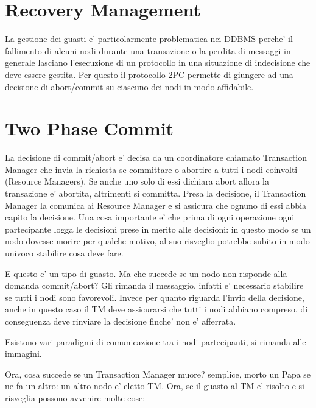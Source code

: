 \section{Recovery Management}

La gestione dei guasti e' particolarmente problematica nei DDBMS perche' il fallimento di alcuni nodi durante una transazione o la perdita di messaggi in generale lasciano l'esecuzione di un protocollo in una situazione di indecisione che deve essere gestita.
Per questo il protocollo 2PC permette di giungere ad una decisione di abort/commit su ciascuno dei nodi in modo affidabile.

\section{Two Phase Commit}


La decisione di commit/abort e' decisa da un coordinatore chiamato Transaction Manager che invia la richiesta se committare o abortire a tutti i nodi coinvolti (Resource Managers). Se anche uno solo di essi dichiara abort allora la transazione e' abortita, altrimenti si committa. Presa la decisione, il Transaction Manager la comunica ai Resource Manager e si assicura che ognuno di essi abbia capito la decisione.
Una cosa importante e' che prima di ogni operazione ogni partecipante logga le decisioni prese in merito alle decisioni: in questo modo se un nodo dovesse morire per qualche motivo, al suo risveglio potrebbe subito in modo univoco stabilire cosa deve fare.

E questo e' un tipo di guasto. Ma che succede se un nodo non risponde alla domanda commit/abort? Gli rimanda il messaggio, infatti e' necessario stabilire se tutti i nodi sono favorevoli.
Invece per quanto riguarda l'invio della decisione, anche in questo caso il TM deve assicurarsi che tutti i nodi abbiano compreso, di conseguenza deve rinviare la decisione finche' non e' afferrata.

Esistono vari paradigmi di comunicazione tra i nodi partecipanti, si rimanda alle immagini.


Ora, cosa succede se un Transaction Manager muore? semplice, morto un Papa se ne fa un altro: un altro nodo e' eletto TM.
Ora, se il guasto al TM e' risolto e si risveglia possono avvenire molte cose:

